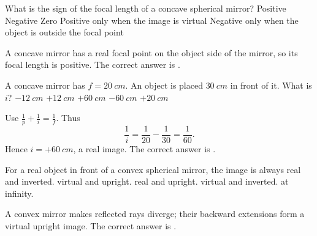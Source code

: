 \documentclass[full,print,11pt,a4paper]{physicsquiz}
\begin{document}
\begin{quizbank}
  \begin{quizquestion}[
    id=optics-mirror-004,
    topic=spherical-mirrors,
    difficulty=foundation,
    marks=1,
    correct=A,
    tags={concave-mirror,focus},
    outcome={Identify the sign of focal length for mirrors}
  ]
    What is the sign of the focal length of a concave spherical mirror?
    \choices
      {Positive}
      {Negative}
      {Zero}
      {Positive only when the image is virtual}
      {Negative only when the object is outside the focal point}
  \end{quizquestion}
  \begin{quizsolution}
    A concave mirror has a real focal point on the object side of the mirror, so
    its focal length is positive. The correct answer is \quizcorrectletter.
  \end{quizsolution}

  \begin{quizquestion}[
    id=optics-mirror-005,
    topic=spherical-mirrors,
    difficulty=applied,
    marks=1,
    correct=C,
    tags={mirror-equation,calculation},
    outcome={Use the spherical mirror equation}
  ]
    A concave mirror has \(f=\SI{20}{cm}\). An object is placed
    \(\SI{30}{cm}\) in front of it. What is \(i\)?
    \choices
      {\(-\SI{12}{cm}\)}
      {\(+\SI{12}{cm}\)}
      {\(+\SI{60}{cm}\)}
      {\(-\SI{60}{cm}\)}
      {\(+\SI{20}{cm}\)}
  \end{quizquestion}
  \begin{quizsolution}
    Use \(\frac{1}{p}+\frac{1}{i}=\frac{1}{f}\). Thus
    \[
      \frac{1}{i}=\frac{1}{20}-\frac{1}{30}=\frac{1}{60}.
    \]
    Hence \(i=+\SI{60}{cm}\), a real image. The correct answer is
    \quizcorrectletter.
  \end{quizsolution}

  \begin{quizquestion}[
    id=optics-mirror-006,
    topic=spherical-mirrors,
    difficulty=foundation,
    marks=1,
    correct=B,
    tags={convex-mirror,image-type},
    outcome={Recall the image type produced by a convex mirror}
  ]
    For a real object in front of a convex spherical mirror, the image is always
    \choices
      {real and inverted.}
      {virtual and upright.}
      {real and upright.}
      {virtual and inverted.}
      {at infinity.}
  \end{quizquestion}
  \begin{quizsolution}
    A convex mirror makes reflected rays diverge; their backward extensions form
    a virtual upright image. The correct answer is \quizcorrectletter.
  \end{quizsolution}


\end{quizbank}
\end{document}
